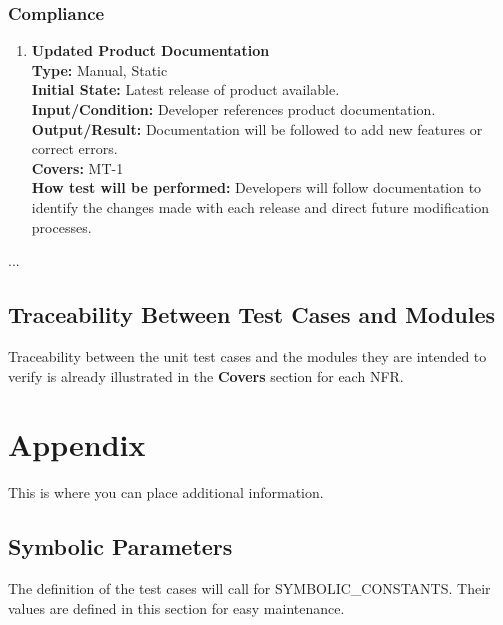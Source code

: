 \documentclass[12pt, titlepage]{article}
\begin{document}
\subsubsection{Compliance}
\begin{enumerate}[label=\bfseries ST-\arabic*:, wide=0pt]
  \item \label{test-ST1} \textbf{Updated Product Documentation}\\[2mm]
    {\bf Type:} Manual, Static\\
    {\bf Initial State:} Latest release of product available.\\
    {\bf Input/Condition:} Developer references product documentation.\\
    {\bf Output/Result:} Documentation will be followed to add new features or correct errors.\\
    {\bf Covers:} MT-1\\
    {\bf How test will be performed:} Developers will follow documentation to identify the changes made with each release and direct future modification processes.
\end{enumerate}

...

\subsection{Traceability Between Test Cases and Modules}

Traceability between the unit test cases and the modules they are intended to verify is already illustrated in the \textbf{Covers} section for each NFR.





\newpage

\section{Appendix}

This is where you can place additional information.

\subsection{Symbolic Parameters}

The definition of the test cases will call for SYMBOLIC\_CONSTANTS.
Their values are defined in this section for easy maintenance.
\end{document}
